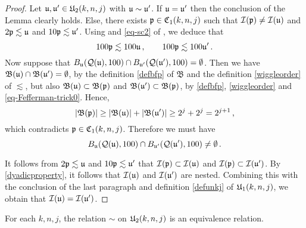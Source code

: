 \begin{proof}
    \leanok
    Let ${\mathfrak u}, {\mathfrak u}' \in {\mathfrak U}_2(k,n,j)$ with ${\mathfrak u} \sim {\mathfrak u}'$. If ${\mathfrak u} = {\mathfrak u}'$ then the conclusion of the Lemma clearly holds. Else, there exists ${\mathfrak p} \in {\mathfrak C}_1(k,n,j)$ such that ${\mathcal{I}}({\mathfrak p}) \ne {\mathcal{I}}({\mathfrak u})$ and $2 {\mathfrak p} \lesssim {\mathfrak u}$ and $10 {\mathfrak p} \lesssim {\mathfrak u}'$.
    Using  and \eqref{eq-sc2} of , we deduce that
    \begin{equation}
        \label{eq-Fefferman-trick0}
        100 {\mathfrak p}\lesssim 100 {\mathfrak u}\,, \qquad 100 {\mathfrak p} \lesssim 100{\mathfrak u}'\,.
    \end{equation}
    Now suppose that $B_{{\mathfrak u}}({\mathcal{Q}}({\mathfrak u}), 100) \cap B_{{\mathfrak u}'}({\mathcal{Q}}({\mathfrak u}'), 100) = \emptyset$. Then we have $\mathfrak{B}({\mathfrak u}) \cap \mathfrak{B}({\mathfrak u}') = \emptyset$, by the definition \eqref{defbfp} of $\mathfrak{B}$ and the definition \eqref{wiggleorder} of $\lesssim$, but also $\mathfrak{B}({\mathfrak u}) \subset \mathfrak{B}({\mathfrak p})$ and $\mathfrak{B}({\mathfrak u}') \subset \mathfrak{B}({\mathfrak p})$, by \eqref{defbfp}, \eqref{wiggleorder} and \eqref{eq-Fefferman-trick0}.
    Hence,
    $$
        |\mathfrak{B}({\mathfrak p})| \geq |\mathfrak{B}({\mathfrak u})| + |\mathfrak{B}({\mathfrak u}')| \geq 2^{j} + 2^j = 2^{j+1}\,,
    $$
    which contradicts ${\mathfrak p} \in {\mathfrak C}_1(k,n,j)$. Therefore we must have
    \begin{equation*}
        B_{{\mathfrak u}}({\mathcal{Q}}({\mathfrak u}), 100) \cap B_{{\mathfrak u}'}({\mathcal{Q}}({\mathfrak u}'), 100) \ne \emptyset\, .
    \end{equation*}

    It follows from $2{\mathfrak p} \lesssim {\mathfrak u}$ and $10{\mathfrak p} \lesssim {\mathfrak u}'$ that ${\mathcal{I}}({\mathfrak p}) \subset {\mathcal{I}}({\mathfrak u})$ and ${\mathcal{I}}({\mathfrak p}) \subset {\mathcal{I}}({\mathfrak u}')$. By \eqref{dyadicproperty}, it follows that ${\mathcal{I}}({\mathfrak u})$ and ${\mathcal{I}}({\mathfrak u}')$ are nested.
    Combining this with the conclusion of the last paragraph and definition \eqref{defunkj} of ${\mathfrak U}_1(k,n,j)$, we obtain that ${\mathcal{I}}({\mathfrak u}) = {\mathcal{I}}({\mathfrak u}')$.
\end{proof}


\begin{lemma}
\label{equivalence-relation}
\leanok
{}
For each $k,n,j$, the relation $\sim$ on
${\mathfrak U}_2(k,n,j)$ is an equivalence relation.
\end{lemma}

